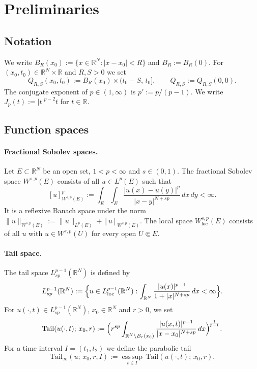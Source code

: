 \documentclass[11pt, a4paper, twoside]{article}
\theoremstyle{definition}
\theoremstyle{remark}
\newcommand{\R}{\mathbb{R}}
\newcommand{\esssup}{\operatorname*{ess\,sup}}
\begin{document}


\section{Preliminaries}
\label{sec:prelim}

\subsection*{Notation}

We write $B_R(x_0) := \{x \in \R^N : |x - x_0| < R\}$ and
$B_R := B_R(0)$. For $(x_0, t_0) \in \R^N \times \R$ and
$R, S > 0$ we set
\[
  Q_{R,S}(x_0,t_0)
  := B_R(x_0) \times (t_0 - S,\, t_0], \qquad
  Q_{R,S} := Q_{R,S}(0,0).
\]
The conjugate exponent of $p \in (1,\infty)$ is
$p' := p/(p-1)$. We write $J_p(t) := |t|^{p-2}t$ for
$t \in \R$.

\subsection*{Function spaces}

\paragraph{Fractional Sobolev spaces.}
Let $E \subset \R^N$ be an open set,  $1<p<\infty$ and $s \in (0,1)$. The fractional Sobolev space
$W^{s,p}(E)$ consists of all $u \in L^p(E)$ such that
\[
  [u]_{W^{s,p}(E)}^p
  := \int_E \int_E
  \frac{|u(x)-u(y)|^p}{|x-y|^{N+sp}}\, dx\, dy < \infty.
\]
It is a reflexive Banach space under the norm $\|u\|_{W^{s,p}(E)} :=
\|u\|_{L^p(E)} + [u]_{W^{s,p}(E)}$. The local
space $W^{s,p}_{\mathrm{loc}}(E)$ consists of all $u$
with $u \in W^{s,p}(U)$ for every open $U \Subset E$.

\paragraph{Tail space.}
The tail space $L^{p-1}_{sp}(\R^N)$ is defined by
\[
  L^{p-1}_{sp}(\R^N)
  := \Bigl\{ u \in L^{p-1}_{\mathrm{loc}}(\R^N) :
     \int_{\R^N}
     \frac{|u(x)|^{p-1}}{1+|x|^{N+sp}}\, dx < \infty
     \Bigr\}.
\]
For $u(\cdot,t) \in L^{p-1}_{sp}(\R^N)$, $x_0 \in \R^N$
and $r > 0$, we set
\[
  \mathrm{Tail}(u(\cdot,t);\, x_0, r)
  := \Bigl( r^{sp}
     \int_{\R^N \setminus B_r(x_0)}
     \frac{|u(x,t)|^{p-1}}{|x-x_0|^{N+sp}}\, dx
     \Bigr)^{\!\frac{1}{p-1}}.
\]
For a time interval $I = (t_1, t_2)$ we define the
parabolic tail
\[
  \mathrm{Tail}_\infty(u;\, x_0, r, I)
  := \esssup_{t \in I}\,
     \mathrm{Tail}(u(\cdot,t);\, x_0, r).
\]
\end{document}
